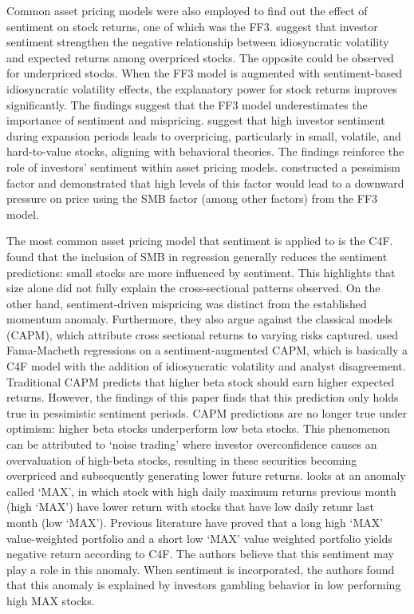 Common asset pricing models were also employed to find out the effect of sentiment on stock returns, one of which was the FF3.  suggest that investor sentiment strengthen the negative relationship between idiosyncratic volatility and expected returns among overpriced stocks. The opposite could be observed for underpriced stocks. When the FF3 model is augmented with sentiment-based idiosyncratic volatility effects, the explanatory power for stock returns improves significantly. The findings suggest that the FF3 model underestimates the importance of sentiment and mispricing.  suggest that high investor sentiment during expansion periods leads to overpricing, particularly in small, volatile, and hard-to-value stocks, aligning with behavioral theories. The findings reinforce the role of investors' sentiment within asset pricing models.  constructed a pessimism factor and demonstrated that high levels of this factor would lead to a downward pressure on price using the SMB factor (among other factors) from the FF3 model.



The most common asset pricing model that sentiment is applied to is the C4F.  found that the inclusion of SMB in regression generally reduces the sentiment predictions: small stocks are more influenced by sentiment. This highlights that size alone did not fully explain the cross-sectional patterns observed. On the other hand, sentiment-driven mispricing was distinct from the established momentum anomaly. Furthermore, they also argue against the classical models (CAPM), which attribute cross sectional returns to varying risks captured.  used Fama-Macbeth regressions on a sentiment-augmented CAPM, which is basically a C4F model with the addition of idiosyncratic volatility and analyst disagreement. Traditional CAPM predicts that higher beta stock should earn higher expected returns. However, the findings of this paper finds that this prediction only holds true in pessimistic sentiment periods. CAPM predictions are no longer true under optimism: higher beta stocks underperform low beta stocks. This phenomenon can be attributed to `noise trading' where investor overconfidence causes an overvaluation of high-beta stocks, resulting in these securities becoming overpriced and subsequently generating lower future returns.  looks at an anomaly called `MAX', in which stock with high daily maximum returns previous month (high `MAX') have lower return with stocks that have low daily retunr last month (low `MAX'). Previous literature have proved that a long high `MAX' value-weighted portfolio and a short low `MAX' value weighted portfolio yields negative return according to C4F. The authors believe that this sentiment may play a role in this anomaly. When sentiment is incorporated, the authors found that this anomaly is explained by investors gambling behavior in low performing high MAX stocks.



